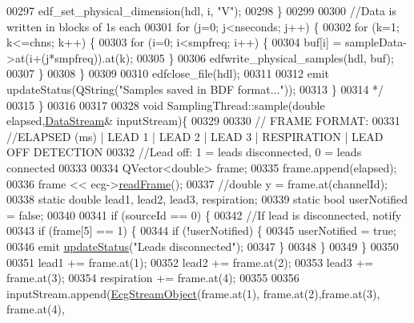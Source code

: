 \begin{DoxyCode}
00297 \textcolor{comment}{            edf\_set\_physical\_dimension(hdl, i, "V");}
00298 \textcolor{comment}{        \}}
00299 \textcolor{comment}{}
00300 \textcolor{comment}{        //Data is written in blocks of 1s each}
00301 \textcolor{comment}{        for (j=0; j<nseconds; j++) \{}
00302 \textcolor{comment}{            for (k=1; k<=chns; k++) \{}
00303 \textcolor{comment}{                for (i=0; i<smpfreq; i++) \{}
00304 \textcolor{comment}{                    buf[i] = sampleData->at(i+(j*smpfreq)).at(k);}
00305 \textcolor{comment}{                \}}
00306 \textcolor{comment}{                edfwrite\_physical\_samples(hdl, buf);}
00307 \textcolor{comment}{            \}}
00308 \textcolor{comment}{        \}}
00309 \textcolor{comment}{}
00310 \textcolor{comment}{        edfclose\_file(hdl);}
00311 \textcolor{comment}{}
00312 \textcolor{comment}{        emit updateStatus(QString("Samples saved in BDF format..."));}
00313 \textcolor{comment}{    \}}
00314 \textcolor{comment}{ */}
00315 \}
00316 
00317 
00328 \textcolor{keywordtype}{void} SamplingThread::sample(\textcolor{keywordtype}{double} elapsed,\hyperlink{classDataStream}{DataStream}& inputStream)\{
00329 
00330     \textcolor{comment}{// FRAME FORMAT:}
00331     \textcolor{comment}{//ELAPSED (ms) | LEAD 1 | LEAD 2 | LEAD 3 | RESPIRATION | LEAD OFF DETECTION}
00332     \textcolor{comment}{//Lead off: 1 = leads disconnected, 0 = leads connected}
00333 
00334     QVector<double> frame;
00335     frame.append(elapsed);
00336     frame << ecg->\hyperlink{group__Device-Facade_ga644ec3752de6ee1e818b5fcd1de5decd}{readFrame}();
00337     \textcolor{comment}{//double y = frame.at(channelId);}
00338     \textcolor{keyword}{static} \textcolor{keywordtype}{double} lead1, lead2, lead3, respiration;
00339     \textcolor{keyword}{static} \textcolor{keywordtype}{bool} userNotified = \textcolor{keyword}{false};
00340 
00341     \textcolor{keywordflow}{if} (sourceId == 0) \{
00342         \textcolor{comment}{//If lead is disconnected, notify}
00343         \textcolor{keywordflow}{if} (frame[5] == 1) \{
00344             \textcolor{keywordflow}{if} (!userNotified) \{
00345                 userNotified = \textcolor{keyword}{true};
00346                 emit \hyperlink{classDeviceInterface_ac64a65f54f41f0b7ff4c846ac7fdbef7}{updateStatus}(\textcolor{stringliteral}{"Leads disconnected"});
00347             \}
00348         \}
00349     \}
00350 
00351     lead1 += frame.at(1);
00352     lead2 += frame.at(2);
00353     lead3 += frame.at(3);
00354     respiration += frame.at(4);
00355 
00356     inputStream.append(\hyperlink{structEcgStreamObject}{EcgStreamObject}(frame.at(1), frame.at(2),frame.at(3), frame.at(4),

\end{DoxyCode}
